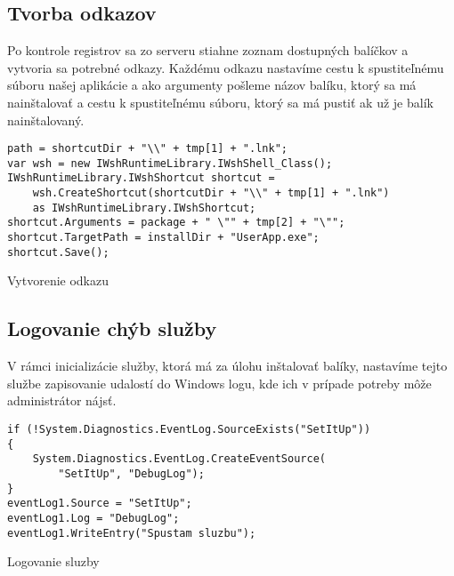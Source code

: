 \subsection{Tvorba odkazov}
Po kontrole registrov sa zo serveru stiahne zoznam dostupných balíčkov a vytvoria sa potrebné odkazy. Každému odkazu nastavíme cestu k spustiteľnému súboru našej aplikácie a ako argumenty pošleme názov balíku, ktorý sa má nainštalovať a cestu k spustiteľnému súboru, ktorý sa má pustiť ak už je balík nainštalovaný.

\begin{listing}
\begin{verbatim}
path = shortcutDir + "\\" + tmp[1] + ".lnk";
var wsh = new IWshRuntimeLibrary.IWshShell_Class();
IWshRuntimeLibrary.IWshShortcut shortcut = 
    wsh.CreateShortcut(shortcutDir + "\\" + tmp[1] + ".lnk")
    as IWshRuntimeLibrary.IWshShortcut;
shortcut.Arguments = package + " \"" + tmp[2] + "\"";
shortcut.TargetPath = installDir + "UserApp.exe";
shortcut.Save();
\end{verbatim}
\caption{Vytvorenie odkazu}
\label{lst:shortcut}
\end{listing}

\subsection{Logovanie chýb služby}
V rámci inicializácie služby, ktorá má za úlohu inštalovať balíky, nastavíme tejto službe zapisovanie udalostí do Windows logu, kde ich v prípade potreby môže administrátor nájsť.
\begin{listing}
\begin{verbatim}
if (!System.Diagnostics.EventLog.SourceExists("SetItUp"))
{
    System.Diagnostics.EventLog.CreateEventSource(
        "SetItUp", "DebugLog");
}
eventLog1.Source = "SetItUp";
eventLog1.Log = "DebugLog";
eventLog1.WriteEntry("Spustam sluzbu");
\end{verbatim}
\caption{Logovanie sluzby}
\label{lst:initlog}
\end{listing}

